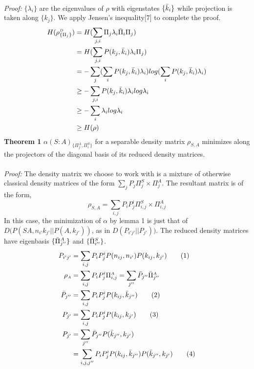 \documentclass[8pt]{article}
\begin{document}
\\
\textit{Proof:} $\{\lambda_{i}\}$ are the eigenvalues of $\rho$ with eigenstates $\{\Bar{k}_{i}\}$ while projection is taken along $\{k_{j}\}$. We apply Jensen's inequality[7] to complete the proof.
\begin{align*}
    H(\rho^{\scriptscriptstyle{D}}_{\{{\Pi_{j}\}}}) &= H(\sum_{j,i}\Pi_{j}\lambda_{i}\Bar{\Pi}_{i}\Pi_{j})\\
    &= H(\sum_{j,i}P(k_{j},\Bar{k}_{i})\lambda_{i}\Pi_{j})\\
    &= -\sum_{j}(\sum_{i}P(k_{j},\Bar{k}_{i})\lambda_{i})log(\sum_{i}P(k_{j},\Bar{k}_{i})\lambda_{i})\\
    &\geq -\sum_{j,i}P(k_{j},\Bar{k}_{i})\lambda_{i}log\lambda_{i}\\
    &\geq -\sum_{i}\lambda_{i}log\lambda_{i}\\
    &\geq  H(\rho)
\end{align*}
\textbf{Theorem 1} $\alpha(S:A)_{\{{\Pi}^{A}_{j},{\Pi}^{S}_{i}\}}$ for a separable density matrix $\rho_{\scriptscriptstyle{S,A}}$ minimizes along the projectors of the diagonal basis of its reduced density matrices.\\
\\
\textit{Proof:} The density matrix we choose to work with is a mixture of otherwise classical density matrices of the form $\sum_{j}P_{j}\Pi^{\scriptscriptstyle{S}}_{j} \times \Pi^{\scriptscriptstyle{A}}_{j}$. The resultant matrix is of the form,
\[ \rho_{\scriptscriptstyle{S,A}} = \sum_{i,j}P_{i}P^{i}_{j}\Pi^{\scriptscriptstyle{S}}_{i,j} \times \Pi^{\scriptscriptstyle{A}}_{i,j}\] 
In this case, the minimization of $\alpha$ by lemma 1 is just that of $D(P(SA,n_{i'}k_{j'}||P(A,k_{j'}))$, as in $D(P_{i'j'}||P_{j'}))$. The reduced density matrices have eigenbasis $\{\Bar{{\Pi}}^{A}_{j''}\}$ and $\{\Bar{{\Pi}}^{S}_{i''}\}$. 
\begin{align*}
P_{i'j'} &= \sum_{i,j}P_{i}P^{i}_{j}P(n_{ij},n_{i'})P(k_{ij},k_{j'})  \tag{1}\\ 
     \rho_{\scriptscriptstyle{A}} &= \sum_{i,j}P_{i}P^{i}_{j}\Pi^{\scriptscriptstyle{A}}_{i,j} = \sum_{j''}\Bar{P}_{j''}\Bar{\Pi}^{\scriptscriptstyle{A}}_{j''} \\
 \Bar{P}_{j''} &= \sum_{i,j}P_{i}P^{i}_{j}P(k_{ij},\Bar{k}_{j''}) \tag{2}\\
    P_{j'} &= \sum_{i,j}P_{i}P^{i}_{j}P(k_{ij},k_{j'}) \tag{3}\\ 
    P_{j'} &= \sum_{j''}\Bar{P}_{j''}P(\Bar{k}_{j''},k_{j'}) \\
    &= \sum_{i,j,j''}P_{i}P^{i}_{j}P(k_{ij},\Bar{k}_{j''})P(\Bar{k}_{j''},k_{j'}) \tag{4}
\end{align*}
\end{document}
